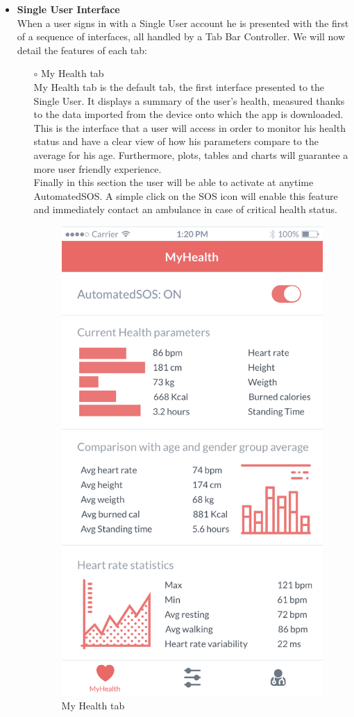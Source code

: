 \documentclass[titlepage]{article}
\begin{document}
\begin{itemize}
\begin{itemize}
				\item{\bf Single User Interface} \\
			When a user signs in with a Single User account he is presented with the first of a sequence of interfaces, all handled by a Tab Bar Controller. We will now detail the features of each tab:
				\begin{itemize}
					\item[$\circ$] My Health tab\\
				My Health tab is the default tab, the first interface presented to the Single User. It displays a summary of the user’s health, measured thanks to the data imported from the device onto which the app is downloaded. This is the interface that a user will access in order to monitor his health status and have a clear view of how his parameters compare to the average for his age. Furthermore, plots, tables and charts will guarantee a more user friendly experience.\\
Finally in this section the user will be able to activate at anytime AutomatedSOS. A simple click on the SOS icon will enable this feature and immediately contact an ambulance in case of critical health status.\\
					\begin{figure}[H]
						\center
  						\includegraphics[width=0.5\columnwidth]{Mockup/mockupMyHealth.png}
  						\caption{My Health tab}
 					 	\label{fig:MyH}
					\end{figure}


\end{itemize}
\end{itemize}
\end{itemize}
\end{document}
